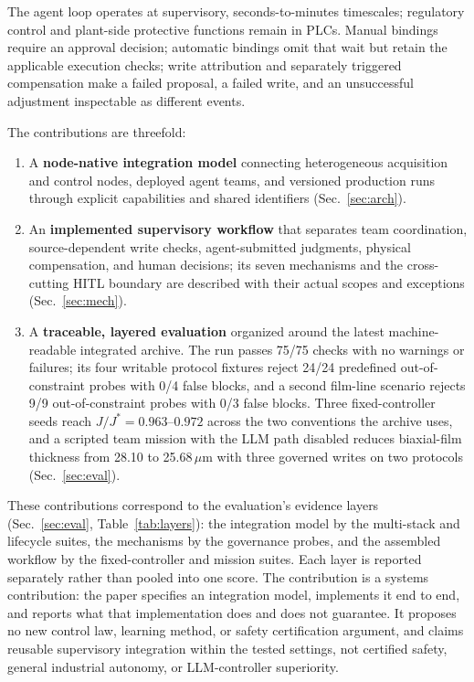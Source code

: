 The agent loop operates at supervisory, seconds-to-minutes timescales; regulatory control and plant-side protective functions remain in PLCs. Manual bindings require an approval decision; automatic bindings omit that wait but retain the applicable execution checks; write attribution and separately triggered compensation make a failed proposal, a failed write, and an unsuccessful adjustment inspectable as different events.

The contributions are threefold:
\begin{enumerate}
\item A \textbf{node-native integration model} connecting heterogeneous acquisition and control nodes, deployed agent teams, and versioned production runs through explicit capabilities and shared identifiers (Sec.~\ref{sec:arch}).
\item An \textbf{implemented supervisory workflow} that separates team coordination, source-dependent write checks, agent-submitted judgments, physical compensation, and human decisions; its seven mechanisms and the cross-cutting HITL boundary are described with their actual scopes and exceptions (Sec.~\ref{sec:mech}).
\item A \textbf{traceable, layered evaluation} organized around the latest
machine-readable integrated archive. The run passes 75/75 checks with no
warnings or failures; its four writable protocol fixtures reject 24/24
predefined out-of-constraint probes with 0/4 false blocks, and a second film-line scenario rejects 9/9 out-of-constraint probes with 0/3 false blocks. Three
fixed-controller seeds reach $J/J^*=0.963$--$0.972$ across the two conventions
the archive uses, and a scripted team mission with the LLM path disabled
reduces biaxial-film thickness from 28.10 to 25.68\,$\mu$m with three governed
writes on two protocols (Sec.~\ref{sec:eval}).
\end{enumerate}
These contributions correspond to the evaluation's evidence layers
(Sec.~\ref{sec:eval}, Table~\ref{tab:layers}): the integration model by the
multi-stack and lifecycle suites, the mechanisms by the governance probes, and the
assembled workflow by the fixed-controller and mission suites. Each layer is
reported separately rather than pooled into one score. The contribution is a
systems contribution: the paper specifies an integration model, implements it end
to end, and reports what that implementation does and does not guarantee. It
proposes no new control law, learning method, or safety certification argument, and
claims reusable supervisory integration within the tested settings, not certified
safety, general industrial autonomy, or LLM-controller superiority.
